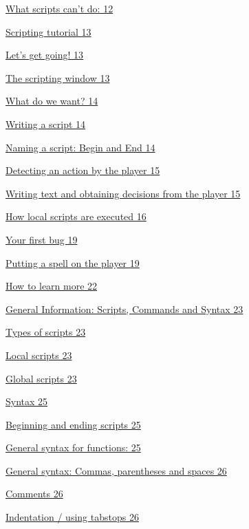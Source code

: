 \documentclass[
]{article}
\begin{document}
\protect\hyperlink{what-scripts-cant-do}{What scripts can't do: 12}

\protect\hyperlink{_Toc53412554}{Scripting tutorial 13}

\protect\hyperlink{lets-get-going}{Let's get going! 13}

\protect\hyperlink{the-scripting-window}{The scripting window 13}

\protect\hyperlink{what-do-we-want}{What do we want? 14}

\protect\hyperlink{writing-a-script}{Writing a script 14}

\protect\hyperlink{naming-a-script-begin-and-end}{Naming a script: Begin
and End 14}

\protect\hyperlink{detecting-an-action-by-the-player}{Detecting an
action by the player 15}

\protect\hyperlink{writing-text-and-obtaining-decisions-from-the-player}{Writing
text and obtaining decisions from the player 15}

\protect\hyperlink{how-local-scripts-are-executed}{How local scripts are
executed 16}

\protect\hyperlink{your-first-bug}{Your first bug 19}

\protect\hyperlink{putting-a-spell-on-the-player}{Putting a spell on the
player 19}

\protect\hyperlink{how-to-learn-more}{How to learn more 22}

\protect\hyperlink{general-information-scripts-commands-and-syntax}{General
Information: Scripts, Commands and Syntax 23}

\protect\hyperlink{types-of-scripts}{Types of scripts 23}

\protect\hyperlink{local-scripts}{Local scripts 23}

\protect\hyperlink{global-scripts}{Global scripts 23}

\protect\hyperlink{syntax}{Syntax 25}

\protect\hyperlink{beginning-and-ending-scripts}{Beginning and ending
scripts 25}

\protect\hyperlink{general-syntax-for-functions}{General syntax for
functions: 25}

\protect\hyperlink{general-syntax-commas-parentheses-and-spaces}{General
syntax: Commas, parentheses and spaces 26}

\protect\hyperlink{comments}{Comments 26}

\protect\hyperlink{indentation-using-tabstops}{Indentation / using
tabstops 26}
\end{document}

